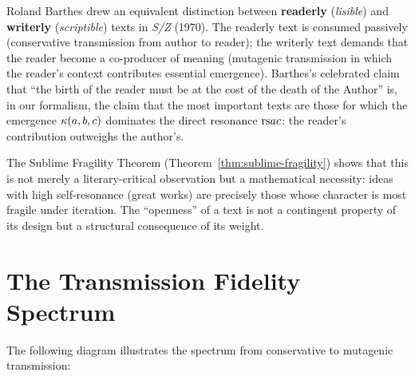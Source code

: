 \begin{interpretation}
Roland Barthes drew an equivalent distinction between \textbf{readerly}
(\emph{lisible}) and \textbf{writerly} (\emph{scriptible}) texts in
\emph{S/Z} (1970).  The readerly text is consumed passively (conservative
transmission from author to reader); the writerly text demands that the
reader become a co-producer of meaning (mutagenic transmission in which the
reader's context contributes essential emergence).  Barthes's celebrated
claim that ``the birth of the reader must be at the cost of the death of the
Author'' is, in our formalism, the claim that the most important texts are
those for which the emergence $\kappa(a, b, c)$ dominates the direct
resonance $\mathrm{rs}{a}{c}$: the reader's contribution outweighs the author's.

The Sublime Fragility Theorem (Theorem~\ref{thm:sublime-fragility})
shows that this is not merely a literary-critical observation but a
mathematical necessity: ideas with high self-resonance (great works) are
precisely those whose character is most fragile under iteration.  The
``openness'' of a text is not a contingent property of its design but a
structural consequence of its weight.
\end{interpretation}



\section{The Transmission Fidelity Spectrum}

The following diagram illustrates the spectrum from conservative to mutagenic
transmission:

